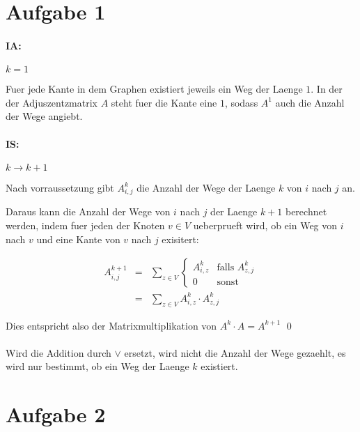 




\newcommand{\nr}{8}


\section*{Aufgabe 1}

\paragraph{IA:} $k=1$

Fuer jede Kante in dem Graphen existiert jeweils ein Weg der Laenge $1$. In der der Adjuszentzmatrix $A$
steht fuer die Kante eine $1$, sodass $A^1$ auch die Anzahl der Wege angiebt.

\paragraph{IS:} $k \to k+1$

Nach vorraussetzung gibt $A^k_{i,j}$ die Anzahl der Wege der Laenge $k$ von $i$ nach $j$ an.

Daraus kann die Anzahl der Wege von $i$ nach $j$ der Laenge $k+1$ berechnet werden,
indem fuer jeden der Knoten $v \in V$ ueberprueft wird, ob ein Weg von $i$ nach $v$ und eine Kante 
von $v$ nach $j$ exisitert:

\begin{eqnarray}
A^{k+1}_{i,j} &=& \sum_{z \in V} \begin{cases} A^k_{i,z} & \text{falls $A^k_{z,j}$} \\0 & \text{sonst}  \end{cases}\\
        &=& \sum_{z \in V} A^k_{i,z} \cdot A^k_{z,j}
\end{eqnarray}

Dies entspricht also der Matrixmultiplikation von $A^k\cdot A = A^{k+1}$ \qed


\paragraph{}
Wird die Addition durch $\lor$ ersetzt, wird nicht die Anzahl der Wege gezaehlt, es wird nur bestimmt, ob ein Weg
der Laenge $k$ existiert.

\section*{Aufgabe 2}

